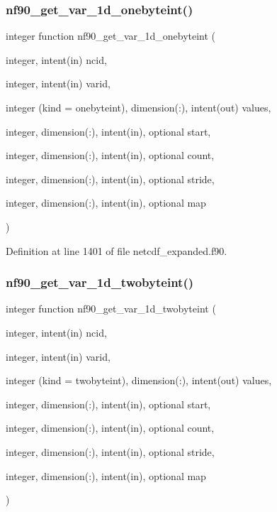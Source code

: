 \subsubsection{\texorpdfstring{nf90\+\_\+get\+\_\+var\+\_\+1d\+\_\+onebyteint()}{nf90\_get\_var\_1d\_onebyteint()}}
{\footnotesize\ttfamily integer function nf90\+\_\+get\+\_\+var\+\_\+1d\+\_\+onebyteint (\begin{DoxyParamCaption}\item[{integer, intent(in)}]{ncid,  }\item[{integer, intent(in)}]{varid,  }\item[{integer (kind = onebyteint), dimension(\+:), intent(out)}]{values,  }\item[{integer, dimension(\+:), intent(in), optional}]{start,  }\item[{integer, dimension(\+:), intent(in), optional}]{count,  }\item[{integer, dimension(\+:), intent(in), optional}]{stride,  }\item[{integer, dimension(\+:), intent(in), optional}]{map }\end{DoxyParamCaption})}



Definition at line 1401 of file netcdf\+\_\+expanded.\+f90.

\mbox{\label{netcdf__expanded_8f90_a986294ec0a7f1fcececbd52818b518b6}} 
\subsubsection{\texorpdfstring{nf90\+\_\+get\+\_\+var\+\_\+1d\+\_\+twobyteint()}{nf90\_get\_var\_1d\_twobyteint()}}
{\footnotesize\ttfamily integer function nf90\+\_\+get\+\_\+var\+\_\+1d\+\_\+twobyteint (\begin{DoxyParamCaption}\item[{integer, intent(in)}]{ncid,  }\item[{integer, intent(in)}]{varid,  }\item[{integer (kind = twobyteint), dimension(\+:), intent(out)}]{values,  }\item[{integer, dimension(\+:), intent(in), optional}]{start,  }\item[{integer, dimension(\+:), intent(in), optional}]{count,  }\item[{integer, dimension(\+:), intent(in), optional}]{stride,  }\item[{integer, dimension(\+:), intent(in), optional}]{map }\end{DoxyParamCaption})}



